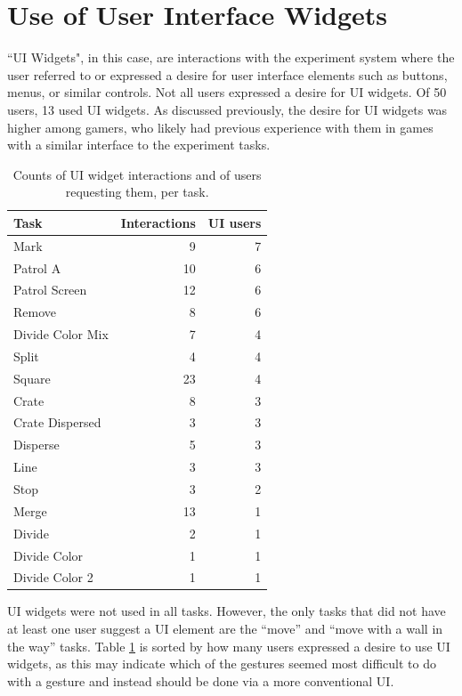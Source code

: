 \section{Use of User Interface Widgets}

``UI Widgets", in this case, are interactions with the experiment system where the user referred to or expressed a desire for user interface elements such as buttons, menus, or similar controls.
Not all users expressed a desire for UI widgets. 
Of 50 users, 13 used UI widgets. 
As discussed previously, the desire for UI widgets was higher among gamers, who likely had previous experience with them in games with a similar interface to the experiment tasks. 

\begin{table}
\centering
	\begin{tabular}{l r r}
		Task & Interactions & UI users \\
		\hline
		Mark & 9 & 7\\
		Patrol A & 10 & 6\\
		Patrol Screen & 12 & 6\\
		Remove & 8 & 6 \\
		Divide Color Mix & 7 & 4\\
		Split & 4 & 4 \\
		Square & 23 & 4 \\
		Crate & 8 & 3 \\
		Crate Dispersed & 3 & 3\\
		Disperse & 5 & 3\\
		Line & 3 & 3\\
		Stop & 3 & 2 \\
		Merge & 13 & 1\\
		Divide & 2 & 1\\
		Divide Color & 1 & 1\\
		Divide Color 2 & 1 & 1\\
		
	\end{tabular}
	\caption{Counts of UI widget interactions and of users requesting them, per task.}
	\label{tab:widget_counts_task}
\end{table}


UI widgets were not used in all tasks. 
However, the only tasks that did not have at least one user suggest a UI element are the ``move'' and ``move with a wall in the way'' tasks. 
Table \ref{tab:widget_counts_task} is sorted by how many users expressed a desire to use UI widgets, as this may indicate which of the gestures seemed most difficult to do with a gesture and instead should be done via a more conventional UI. 


